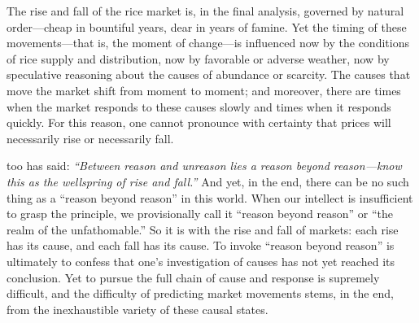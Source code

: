 \commentary
The rise and fall of the rice market is, in the final analysis, governed
by natural order---cheap in bountiful years, dear in years of famine.
Yet the timing of these movements---that is, the moment of change---is
influenced now by the conditions of rice supply and distribution, now by
favorable or adverse weather, now by speculative reasoning about the
causes of abundance or scarcity. The causes that move the market shift
from moment to moment; and moreover, there are times when the market
responds to these causes slowly and times when it responds quickly. For
this reason, one cannot pronounce with certainty that prices will
necessarily rise or necessarily fall.

 too has said: \textit{``Between reason and unreason
lies a reason beyond reason---know this as the wellspring of rise and
fall.''} And yet, in the end, there can be no such thing as a ``reason
beyond reason'' in this world. When our intellect is insufficient to
grasp the principle, we provisionally call it ``reason beyond reason'' or
``the realm of the unfathomable.'' So it is with the rise and fall of
markets: each rise has its cause, and each fall has its cause. To invoke
``reason beyond reason'' is ultimately to confess that one's investigation
of causes has not yet reached its conclusion. Yet to pursue the full
chain of cause and response is supremely difficult, and the difficulty of
predicting market movements stems, in the end, from the inexhaustible
variety of these causal states.
